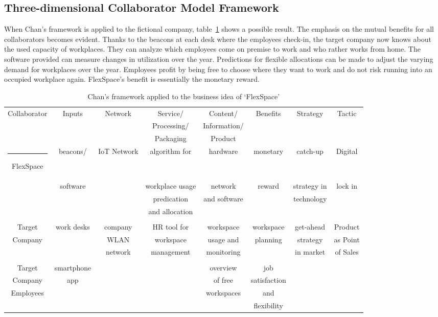 	\subsection{Three-dimensional Collaborator Model Framework}
	\vspace{-1em}
			When  Chan's framework is applied to the fictional company, table~\ref{tab:use_case_chan} shows a possible result. The emphasis on the mutual benefits for all collaborators becomes evident. Thanks to the beacons at each desk where the employees check-in, the target company now knows about the used capacity of workplaces. They can analyze which employees come on premise to work and who rather works from home. The software provided can measure changes in utilization over the year. Predictions for flexible allocations can be made to adjust the varying demand for workplaces over the year. Employees profit by being free to choose where they want to work and do not risk running into an occupied workplace again. FlexSpace's benefit is essentially the monetary reward.
			\begin{table}[h!]
			\scriptsize
			\centering			
			\caption{Chan's framework applied to the business idea of `FlexSpace'}
			\label{tab:use_case_chan}
			\centering
			\vspace{0.2cm}
			               
			\begin{tabular}{|c|c|c|c|c|c|c|c|} \hline
			\rule{0pt}{8pt}

			Collaborator  & Inputs & Network & Service/ & Content/ & Benefits & Strategy & Tactic\rule{0pt}{8pt} \\
			&&&Processing/ & Information/ \\
			&&&Packaging & Product\\	\hline \rule{-2pt}{8pt}

			FlexSpace	& beacons/& IoT Network & algorithm for  & hardware 	& monetary & catch-up & Digital \\
			&software&&workplace usage& network&reward &strategy in & lock in\\
			&&&predication & and software && technology\\
			&&&and allocation\\
			\\
			Target	& work desks & company    & HR tool for & workspace & workspace& get-ahead	 & Product \\
			Company&&WLAN & workspace & usage and & planning&strategy & as Point\\
			&&network&management & monitoring && in market& of Sales \\
			\\
			Target	& smartphone  &&&  overview &job\\
			Company 	& app && & of free  & satisfaction\\
			Employees		&				&&& workspaces& and	&&\\
			&&&&&flexibility\\ \hline
			\end{tabular}
			\end{table}
